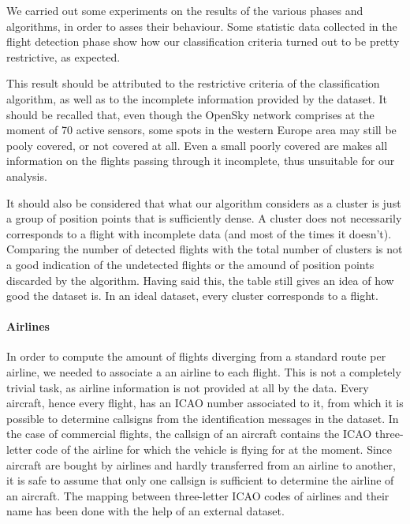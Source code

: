\documentclass{vldb}
\begin{document}
We carried out some experiments on the results of the various phases and
algorithms, in order to asses their behaviour. Some statistic data collected in
the flight detection phase show how our classification criteria turned out to be
pretty restrictive, as expected.

This result should be attributed to the restrictive criteria of the
classification algorithm, as well as to the incomplete information provided by
the dataset. It should be recalled that, even though the OpenSky network
comprises at the moment of 70 active sensors, some spots in the western Europe
area may still be pooly covered, or not covered at all. Even a small poorly
covered are makes all information on the flights passing through it incomplete,
thus unsuitable for our analysis.

It should also be considered that what our algorithm considers as a cluster is
just a group of position points that is sufficiently dense. A cluster does not
necessarily corresponds to a flight with incomplete data (and most of the times
it doesn't). Comparing the number of detected flights with the total number of
clusters is not a good indication of the undetected flights or the amound of
position points discarded by the algorithm.
Having said this, the table still gives an idea of how good the dataset is. In
an ideal dataset, every cluster corresponds to a flight.


\paragraph{Airlines}

In order to compute the amount of flights diverging from a standard route per
airline, we needed to associate a an airline to each flight. This is not a
completely trivial task, as airline information is not provided at all by the
data. Every aircraft, hence every flight, has an ICAO number associated to it,
from which it is possible to determine callsigns from the identification
messages in the dataset. In the case of commercial flights, the callsign of an
aircraft contains the ICAO three-letter code of the airline for which the
vehicle is flying for at the moment. Since aircraft are bought by airlines and
hardly transferred from an airline to another, it is safe to assume that only
one callsign is sufficient to determine the airline of an aircraft.
The mapping between three-letter ICAO codes of airlines and their name has been
done with the help of an external dataset.
\end{document}

